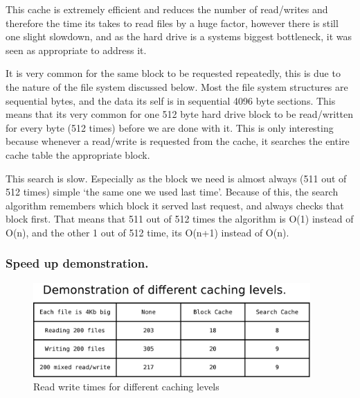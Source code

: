 \documentclass[a4paper]{report}
\begin{document}
This cache is extremely efficient and reduces the number of read/writes and therefore the time its takes to read files by a huge factor, however there is still one slight slowdown, and as the hard drive is a systems biggest bottleneck, it was seen as appropriate to address it.

It is very common for the same block to be requested repeatedly, this is due to the nature of the file system discussed below. Most the file system structures are sequential bytes, and the data its self is in sequential 4096 byte sections. This means that its very common for one 512 byte hard drive block to be read/written for every byte (512 times) before we are done with it. This is only interesting because whenever a read/write is requested from the cache, it searches the entire cache table the appropriate block.

This search is slow. Especially as the block we need is almost always (511 out of 512 times) simple `the same one we used last time'. Because of this, the search algorithm remembers which block it served last request, and always checks that block first. That means that 511 out of 512 times the algorithm is O(1) instead of O(n), and the other 1 out of 512 time, its O(n+1) instead of O(n).

\subsubsection{Speed up demonstration.}

\begin{figure}[ht]
\centering
\includegraphics[width=400px]{images/Caching_Speedup}
\caption{Read write times for different caching levels}
\label{fig:WinTitleBarScreen}
\end{figure}
\end{document}
